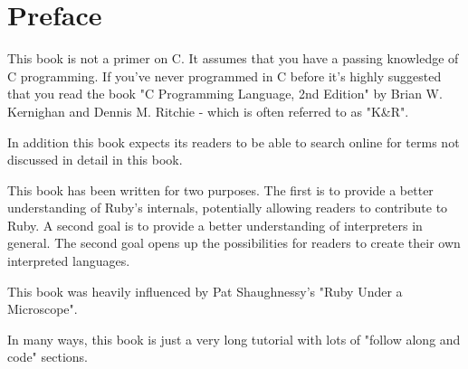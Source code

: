 \chapter*{Preface}

This book is not a primer on C. It assumes that you have a passing knowledge of C programming. If you've never programmed in C before it's highly suggested that you read the book "C Programming Language, 2nd Edition" by Brian W. Kernighan and Dennis M. Ritchie -  which is often referred to as "K\&R".

In addition this book expects its readers to be able to search online for terms not discussed in detail in this book.

This book has been written for two purposes. The first is to provide a better understanding of Ruby's internals, potentially allowing readers to contribute to Ruby. A second goal is to provide a better understanding of interpreters in general. The second goal opens up the possibilities for readers to create their own interpreted languages.

This book was heavily influenced by Pat Shaughnessy's "Ruby Under a Microscope".

In many ways, this book is just a very long tutorial with lots of "follow along and code" sections.
